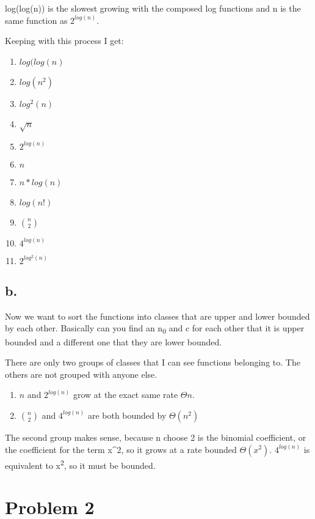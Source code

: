 \documentclass[]{article}
\providecommand{\tightlist}{%
  \setlength{\itemsep}{0pt}\setlength{\parskip}{0pt}}
\begin{document}
log(log(n)) is the slowest growing with the composed log functions and n
is the same function as \(2^{log(n)}\).

Keeping with this process I get:

\begin{enumerate}
\def\labelenumi{\arabic{enumi}.}
\tightlist
\item
  \(log(log(n)\)
\item
  \(log(n^2)\)
\item
  \(log^2(n)\)
\item
  \(\sqrt n\)
\item
  \(2^{log(n)}\)
\item
  \(n\)
\item
  \(n*log(n)\)
\item
  \(log(n!)\)
\item
  \(n \choose 2\)
\item
  \(4^{log(n)}\)
\item
  \(2^{log^2(n)}\)
\end{enumerate}

\subsection{b.}\label{b.}

Now we want to sort the functions into classes that are upper and lower
bounded by each other. Basically can you find an n\textsubscript{0} and
c for each other that it is upper bounded and a different one that they
are lower bounded.

There are only two groups of classes that I can see functions belonging
to. The others are not grouped with anyone else.

\begin{enumerate}
\def\labelenumi{\arabic{enumi}.}
\tightlist
\item
  \(n\) and \(2^{log(n)}\) grow at the exact same rate \(\Theta n\).
\item
  \(\binom{n}{2}\) and \(4^{log(n)}\) are both bounded by
  \(\Theta(n^2)\)
\end{enumerate}

The second group makes sense, because n choose 2 is the binomial
coefficient, or the coefficient for the term x\^{}2, so it grows at a
rate bounded \(\Theta(x^2)\). \(4^{log(n)}\) is equivalent to
x\textsuperscript{2}, so it must be bounded.

\section{Problem 2}\label{problem-2}
\end{document}
